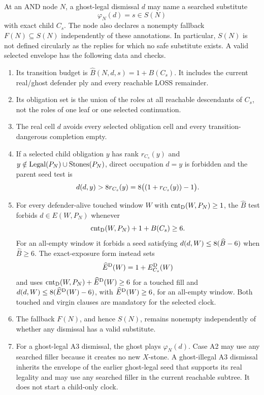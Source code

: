 \begin{definition}
\label{def:D17}
At an AND node $N$, a ghost-legal dismissal $d$ may name a searched substitute
\[
 \varphi_N(d)=s\in S(N)
\]
with exact child $C_s$.  The node also declares a nonempty fallback
$F(N)\subseteq S(N)$ independently of these annotations.  In particular,
$S(N)$ is not defined circularly as the replies for which no safe substitute
exists.  A valid selected envelope has the following data and checks.
\begin{enumerate}[label=\textup{(\arabic*)},leftmargin=10mm]
  \item Its transition budget is
  $\widehat B(N,d,s)=1+B(C_s)$.  It includes the current real/ghost defender
  ply and every reachable LOSS remainder.

  \item Its obligation set is the union of the roles at all reachable
  descendants of $C_s$, not the roles of one leaf or one selected
  continuation.

  \item The real cell $d$ avoids every selected obligation cell and every
  transition-dangerous completion empty.

  \item If a selected child obligation $y$ has rank $r_{C_s}(y)$ and
  $y\notin\operatorname{Legal}(P_N)\cup\operatorname{Stones}(P_N)$, direct occupation $d=y$ is forbidden
  and the parent seed test is
  \[
    d(d,y)>8r_{C_s}(y)
      =8\bigl((1+r_{C_s}(y))-1\bigr).
  \]

  \item For every defender-alive touched window $W$ with
  $\operatorname{cnt}_{\mathrm{D}}(W,P_N)\ge1$, the $\widehat B$ test forbids
  $d\in E(W,P_N)$ whenever
  \[
    \operatorname{cnt}_{\mathrm{D}}(W,P_N)+1+B(C_s)\ge6.
  \]
  For an all-empty window it forbids a seed satisfying
  $d(d,W)\le8(\widehat B-6)$ when $\widehat B\ge6$.  The exact-exposure
  form instead sets
  \[
    \widehat E^{\mathrm{D}}(W)=1+E_{C_s}^{\mathrm{D}}(W)
  \]
  and uses $\operatorname{cnt}_{\mathrm{D}}(W,P_N)+\widehat E^{\mathrm{D}}(W)\ge6$ for a touched fill and
  $d(d,W)\le8(\widehat E^{\mathrm{D}}(W)-6)$, with
  $\widehat E^{\mathrm{D}}(W)\ge6$, for an all-empty window.  Both touched and virgin
  clauses are mandatory for the selected clock.

  \item The fallback $F(N)$, and hence $S(N)$, remains nonempty independently
  of whether any dismissal has a valid substitute.

  \item For a ghost-legal A3 dismissal, the ghost plays $\varphi_N(d)$.  Case
  A2 may use any searched filler because it creates no new $X$-stone.  A
  ghost-illegal A3 dismissal inherits the envelope of the earlier ghost-legal
  seed that supports its real legality and may use any searched filler in the
  current reachable subtree.  It does not start a child-only clock.


\end{enumerate}
\end{definition}
